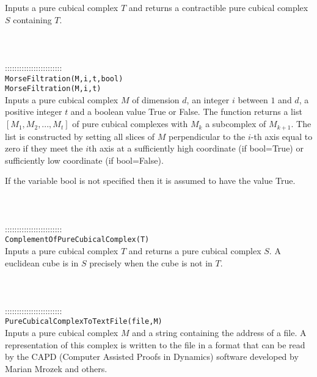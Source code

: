 \documentclass[a4paper,11pt]{report}
\begin{document}
{ Inputs a pure cubical complex $T$ and returns a contractible pure cubical complex $S$ containing $T$. \\
 \\
 \\
 \\
 ::::::::::::::::::::::::\\
 \texttt{MorseFiltration(M,i,t,bool)}\\
 \texttt{MorseFiltration(M,i,t)}\\
 

 Inputs a pure cubical complex $M$ of dimension $d$, an integer $i$ between $1$ and $d$, a positive integer $t$ and a boolean value True or False. The function returns a list $[M_1, M_2, ..., M_t]$ of pure cubical complexes with $M_k$ a subcomplex of $M_{k+1}$. The list is constructed by setting all slices of $M$ perpendicular to the $i$-th axis equal to zero if they meet the $i$th axis at a sufficiently high coordinate (if bool=True) or sufficiently low
coordinate (if bool=False). 

 If the variable bool is not specified then it is assumed to have the value
True. \\
 \\
 \\
 \\
 ::::::::::::::::::::::::\\
 \texttt{ComplementOfPureCubicalComplex(T)}\\
 

 Inputs a pure cubical complex $T$ and returns a pure cubical complex $S$. A euclidean cube is in $S$ precisely when the cube is not in $T$. \\
 \\
 \\
 \\
 ::::::::::::::::::::::::\\
 \texttt{PureCubicalComplexToTextFile(file,M)}\\
 

 Inputs a pure cubical complex $M$ and a string containing the address of a file. A representation of this
complex is written to the file in a format that can be read by the CAPD
(Computer Assisted Proofs in Dynamics) software developed by Marian Mrozek and
others. \\
 \\
 \\
 }

 
\end{document}
